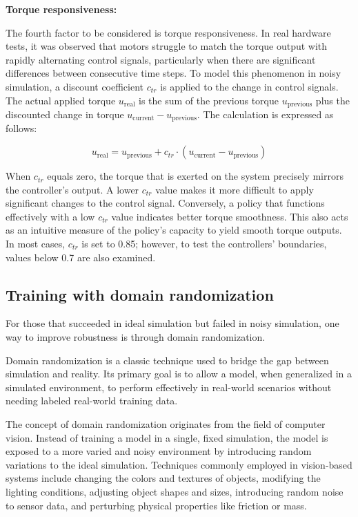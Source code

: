 \textbf{Torque responsiveness:}

The fourth factor to be considered is torque responsiveness. In real hardware tests, it was observed that motors struggle to match the torque output with rapidly alternating control signals, particularly when there are significant differences between consecutive time steps. To model this phenomenon in noisy simulation, a discount coefficient \( c_{tr} \) is applied to the change in control signals. The actual applied torque \(u_{\text{real}}\) is the sum of the previous torque \(u_{\text{previous}}\) plus the discounted change in torque \(u_{\text{current}} - u_{\text{previous}}\). The calculation is expressed as follows:

\begin{equation}
 u_{\text{real}} = u_{\text{previous}} + c_{tr} \cdot (u_{\text{current}} - u_{\text{previous}})
\end{equation}

When \(c_{tr}\) equals zero, the torque that is exerted on the system precisely mirrors the controller's output. A lower \(c_{tr}\) value makes it more difficult to apply significant changes to the control signal. Conversely, a policy that functions effectively with a low \(c_{tr}\) value indicates better torque smoothness. This also acts as an intuitive measure of the policy's capacity to yield smooth torque outputs. In most cases, \(c_{tr}\) is set to 0.85; however, to test the controllers' boundaries, values below 0.7 are also examined.

\subsection{Training with domain randomization}
For those that succeeded in ideal simulation but failed in noisy simulation, one way to improve robustness is through domain randomization.

Domain randomization\cite{tobin2017domain} is a classic technique used to bridge the gap between simulation and reality. Its primary goal is to allow a model, when generalized in a simulated environment, to perform effectively in real-world scenarios without needing labeled real-world training data.

The concept of domain randomization originates from the field of computer vision. Instead of training a model in a single, fixed simulation, the model is exposed to a more varied and noisy environment by introducing random variations to the ideal simulation. Techniques commonly employed in vision-based systems include changing the colors and textures of objects, modifying the lighting conditions, adjusting object shapes and sizes, introducing random noise to sensor data, and perturbing physical properties like friction or mass.

